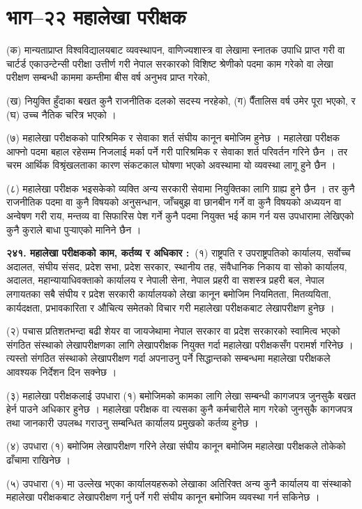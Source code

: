 \section{भाग–२२ महालेखा परीक्षक}

(क) मान्यताप्राप्त विश्वविद्यालयबाट व्यवस्थापन, वाणिज्यशास्त्र वा लेखामा स्नातक उपाधि प्राप्त गरी वा चार्टर्ड एकाउन्टेन्सी परीक्षा उत्तीर्ण गरी नेपाल सरकारको विशिष्ट श्रेणीको पदमा काम गरेको वा लेखा परीक्षण सम्बन्धी काममा कम्तीमा बीस वर्ष अनुभव प्राप्त गरेको,

(ख) नियुक्ति हुँदाका बखत कुनै राजनीतिक दलको सदस्य नरहेको,
(ग) पैँतालिस वर्ष उमेर पूरा भएको, र
(घ) उच्च नैतिक चरित्र भएको ।

(७) महालेखा परीक्षकको पारिश्रमिक र सेवाका शर्त संघीय कानून बमोजिम हुनेछ । महालेखा परीक्षक आफ्नो पदमा बहाल रहेसम्म निजलाई मर्का पर्ने गरी पारिश्रमिक र सेवाका शर्त परिवर्तन गरिने छैन ।
तर चरम आर्थिक विश्रृंखलताका कारण संकटकाल घोषणा भएको अवस्थामा यो व्यवस्था लागू हुने छैन ।

(८) महालेखा परीक्षक भइसकेको व्यक्ति अन्य सरकारी सेवामा नियुक्तिका लागि ग्राह्य हुने छैन ।
तर कुनै राजनीतिक पदमा वा कुनै विषयको अनुसन्धान, जाँचबुझ वा छानबीन गर्ने वा कुनै विषयको अध्ययन वा अन्वेषण गरी राय, मन्तव्य वा सिफारिस पेश गर्ने कुनै पदमा नियुक्त भई काम गर्न यस उपधारामा लेखिएको कुनै कुराले बाधा पुर्‍याएको मानिने छैन ।

\textbf{२४१. महालेखा परीक्षकको काम, कर्तव्य र अधिकार : }(१) राष्ट्रपति र उपराष्ट्रपतिको कार्यालय, सर्वोच्च अदालत, संघीय संसद, प्रदेश सभा, प्रदेश सरकार, स्थानीय तह, संवैधानिक निकाय वा सोको कार्यालय, अदालत, महान्यायाधिवक्ताको कार्यालय र नेपाली सेना, नेपाल प्रहरी वा सशस्त्र प्रहरी बल, नेपाल लगायतका सबै संघीय र प्रदेश सरकारी कार्यालयको लेखा कानून बमोजिम नियमितता, मितव्ययिता, कार्यदक्षता, प्रभावकारिता र औचित्य समेतको विचार गरी महालेखा परीक्षकबाट लेखापरीक्षण हुनेछ ।

(२) पचास प्रतिशतभन्दा बढी शेयर वा जायजेथामा नेपाल सरकार वा प्रदेश सरकारको स्वामित्व भएको संगठित संस्थाको लेखापरीक्षणका लागि लेखापरीक्षक नियुक्त गर्दा महालेखा परीक्षकसँग परामर्श गरिनेछ । त्यस्तो संगठित संस्थाको लेखापरीक्षण गर्दा अपनाउनु पर्ने सिद्धान्तको सम्बन्धमा महालेखा परीक्षकले आवश्यक निर्देशन दिन सक्नेछ ।

(३) महालेखा परीक्षकलाई उपधारा (१) बमोजिमको कामका लागि लेखा सम्बन्धी कागजपत्र जुनसुकै बखत हेर्न पाउने अधिकार हुनेछ ।
महालेखा परीक्षक वा त्यसका कुनै कर्मचारीले माग गरेको जुनसुकै कागजपत्र तथा जानकारी उपलब्ध गराउनु सम्बन्धित कार्यालय प्रमुखको कर्तव्य हुनेछ ।

(४) उपधारा (१) बमोजिम लेखापरीक्षण गरिने लेखा संघीय कानून बमोजिम महालेखा परीक्षकले तोकेको ढाँचामा राखिनेछ ।

(५) उपधारा (१) मा उल्लेख भएका कार्यालयहरूको लेखाका अतिरिक्त अन्य कुनै कार्यालय वा संस्थाको महालेखा परीक्षकबाट लेखापरीक्षण गर्नु पर्ने गरी संघीय कानून बमोजिम व्यवस्था गर्न सकिनेछ ।
